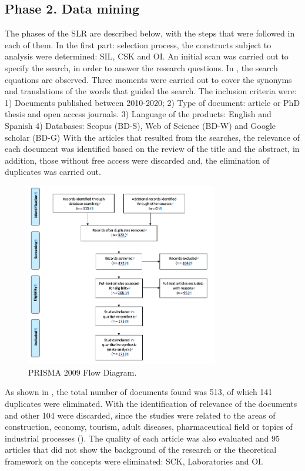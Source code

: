 \documentclass[english]{textolivre}
\begin{document}
\subsection*{Phase 2. Data mining}
The phases of the SLR are described below, with the steps that were followed in each of them. In the first part: selection process, the constructs subject to analysis were determined: SIL, CSK and OI. An initial scan was carried out to specify the search, in order to answer the research questions. In , the search equations are observed. Three moments were carried out to cover the synonyms and translations of the words that guided the search. The inclusion criteria were: 1) Documents published between 2010-2020; 2) Type of document: article or PhD thesis and open access journals. 3) Language of the products: English and Spanish 4) Databases: Scopus (BD-S), Web of Science (BD-W) and Google scholar (BD-G) With the articles that resulted from the searches, the relevance of each document was identified based on the review of the title and the abstract, in addition, those without free access were discarded and, the elimination of duplicates was carried out.

\begin{figure}[htbp]
 \centering
 \includegraphics[width=0.75\textwidth]{fig2-33750.png}
 \caption{PRISMA 2009 Flow Diagram.}
 \label{fig2}
\end{figure}

As shown in , the total number of documents found was 513, of which 141 duplicates were eliminated. With the identification of relevance of the documents and other 104 were discarded, since the studies were related to the areas of construction, economy, tourism, adult diseases, pharmaceutical field or topics of industrial processes (). The quality of each article was also evaluated and 95 articles that did not show the background of the research or the theoretical framework on the concepts were eliminated: SCK, Laboratories and OI.
\end{document}
